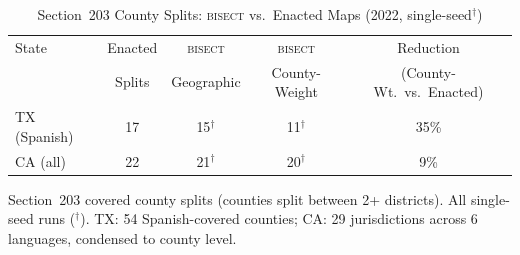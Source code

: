 \begin{table}[ht]
\centering
\caption{Section~203 County Splits: \textsc{bisect} vs.\ Enacted Maps (2022, single-seed$^\dagger$)}
\label{tab:results-203}
\begin{tabular}{lcccc}
\toprule
State & Enacted & \textsc{bisect} & \textsc{bisect} & Reduction \\
      & Splits  & Geographic & County-Weight & (County-Wt.\ vs.\ Enacted) \\
\midrule
TX (Spanish) & 17 & 15$^\dagger$ & 11$^\dagger$ & 35\% \\
CA (all) & 22 & 21$^\dagger$ & 20$^\dagger$ & 9\% \\
\bottomrule
\end{tabular}
\begin{tablenotes}
\small
\item Section~203 covered county splits (counties split between 2+ districts).
      All single-seed runs ($^\dagger$). TX: 54 Spanish-covered counties;
      CA: 29 jurisdictions across 6 languages, condensed to county level.
\end{tablenotes}
\end{table}
